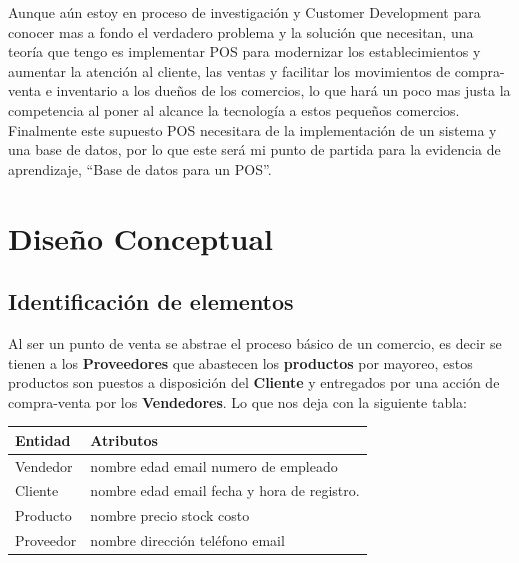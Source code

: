 \documentclass[spanish,12pt,letterpapper]{article}
\begin{document}
Aunque aún estoy en proceso de investigación y Customer Development para conocer mas a fondo el verdadero problema y la solución que necesitan, una teoría que tengo es implementar POS para modernizar los establecimientos y aumentar la atención al cliente, las ventas y facilitar los movimientos de compra-venta e inventario a los dueños de los comercios, lo que hará un poco mas justa la competencia al poner al alcance la tecnología a estos pequeños comercios.\\

Finalmente este supuesto POS necesitara de la implementación de un sistema y una base de datos, por lo que este será mi punto de partida para la evidencia de aprendizaje, ``Base de datos para un POS''.\\

	\section{Diseño Conceptual}
	
	\subsection{Identificación de elementos}
	Al ser un punto de venta se abstrae el proceso básico de un comercio, es decir se tienen a los \textbf{Proveedores} que abastecen los \textbf{ productos} por mayoreo, estos productos son puestos a disposición del \textbf{Cliente} y entregados por una acción de compra-venta por los \textbf{Vendedores}. Lo que nos deja con la siguiente tabla:
	
	\begin{center}
	\begin{tabular}{| p{4cm} | p{4cm} |}
	\hline
	
	Entidad & Atributos\\
	\hline
	Vendedor & nombre \linebreak edad \linebreak email \linebreak numero de empleado\\
	\hline
	Cliente & nombre \linebreak edad \linebreak email \linebreak fecha y hora de registro.\\
	\hline
	Producto & nombre \linebreak precio \linebreak stock \linebreak costo\\
	\hline
	Proveedor & nombre \linebreak dirección \linebreak teléfono \linebreak email\\	
	
	\hline
	\end{tabular}
	\end{center}	 
	
\end{document}

